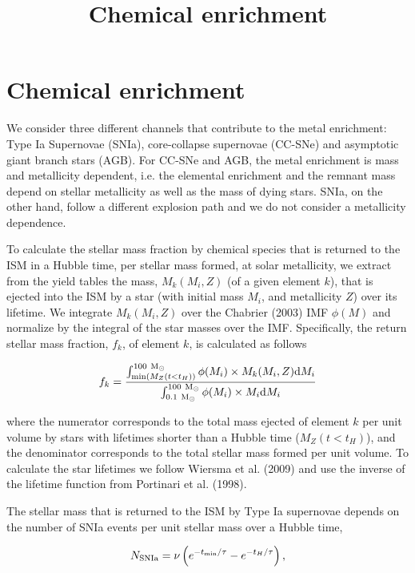 \documentclass[11pt,a4paper,fleqn,usenatbib,twocolumn]{mnras}
\title[Chemical enrichment]{Chemical enrichment}
\author[Camila A. Correa]{}
\begin{document}

\section{Chemical enrichment}

We consider three different channels that contribute to the metal enrichment: Type Ia Supernovae (SNIa), core-collapse supernovae (CC-SNe) and asymptotic giant branch stars (AGB). For CC-SNe and AGB, the metal enrichment is mass and metallicity dependent, i.e. the elemental enrichment and the remnant mass depend on stellar metallicity as well as the mass of dying stars. SNIa, on the other hand, follow a different explosion path and we do not consider a metallicity dependence. 

To calculate the stellar mass fraction by chemical species that is returned to the ISM in a Hubble time, per stellar mass formed, at solar metallicity, we extract from the yield tables the mass, $M_{k}(M_{i},Z)$ (of a given element $k$), that is ejected into the ISM by a star (with initial mass $M_{i}$, and metallicity $Z$) over its lifetime. We integrate $M_{k}(M_{i},Z)$ over the Chabrier (2003) IMF $\phi(M)$ and normalize by the integral of the star masses over the IMF. Specifically, the return stellar mass fraction, $f_{k}$, of element $k$, is calculated as follows

\begin{equation}
f_{k} = \frac{\int_{{\rm{min}}(M_{Z}(t<t_{H}))}^{100~{\rm{M}}_{\odot}}  \phi(M_{i})\times M_{k}(M_{i},Z) {\rm{d}}M_{i}}{\int_{0.1~{\rm{M}}_{\odot}}^{100~{\rm{M}}_{\odot}} \phi(M_{i})\times M_{i}{\rm{d}}M_{i}}
\end{equation}

\noindent where the numerator corresponds to the total mass ejected of element $k$ per unit volume by stars with lifetimes shorter than a Hubble time ($M_{Z}(t<t_{H})$), and the denominator corresponds to the total stellar mass formed per unit volume. To calculate the star lifetimes we follow Wiersma et al. (2009) and use the inverse of the lifetime function from Portinari et al. (1998).

The stellar mass that is returned to the ISM by Type Ia supernovae depends on the number of SNIa events per unit stellar mass over a Hubble time,

\begin{equation}
N_{\rm{SNIa}} = \nu\left(e^{-t_{\rm{min}}/\tau}-e^{-t_{H}/\tau}\right),
\end{equation}
\end{document}

